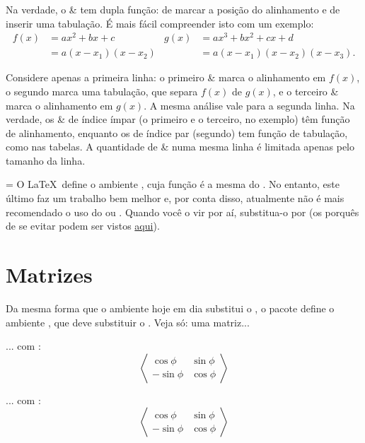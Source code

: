 \documentclass[a4paper,12pt]{amsart}
\newlength\atencaowidth
\newenvironment{atencao}{%
		\medskip%
		\noindent\hangindent=\atencaowidth\hangafter=-2%
		\hspace{-\atencaowidth}%
		\usebox{\atencaobox}\footnotesize
		\setlength\parindent\atencaowidth}{\par\medskip}
\begin{document}
	Na verdade, o \& tem dupla função: de marcar a posição do alinhamento e de inserir uma tabulação. É mais fácil compreender isto com um exemplo:
	\begin{align*}
	f(x) &= ax^2 + bx + c        &    g(x) &= ax^3 + bx^2 + cx + d \\
	     &= a (x - x_1)(x - x_2) &         &= a (x - x_1)(x - x_2)(x - x_3).
	\end{align*}
	
	Considere apenas a primeira linha: o primeiro \& marca o alinhamento em $f(x)$, o segundo marca uma tabulação, que separa $f(x)$ de $g(x)$, e o terceiro \& marca o alinhamento em $g(x)$. A mesma análise vale para a segunda linha. Na verdade, os \& de índice ímpar (o primeiro e o terceiro, no exemplo) têm função de alinhamento, enquanto os de índice par (segundo) tem função de tabulação, como nas tabelas.	A quantidade de \& numa mesma linha é limitada apenas pelo tamanho da linha.
	
	\begin{atencao}%
	O \LaTeX\ define o ambiente , cuja função é a mesma do . No entanto, este último faz um trabalho bem melhor e, por conta disso, atualmente não é mais recomendado o uso do  ou . Quando você o vir por aí, substitua-o por  (os porquês de se evitar  podem ser vistos \href{http://www.tug.org/pracjourn/2006-4/madsen/madsen.pdf}{aqui}).
	\end{atencao}
	
	\section{Matrizes}
	
	Da mesma forma que o ambiente  hoje em dia substitui o , o pacote  define o ambiente , que deve substituir o . Veja só: uma matriz...
	
	\medskip
	
	\noindent\hfill
	\begin{minipage}[t]{0.45\textwidth}
		\centering
		... com :		
		\begin{equation*}
			\left\langle\begin{matrix}
				 \cos\phi & \sin\phi \\
				-\sin\phi & \cos\phi
			\end{matrix}\right\rangle
		\end{equation*}
	\end{minipage}\hfill
	\begin{minipage}[t]{0.45\textwidth}
		\centering
		... com :
		\begin{equation*}
			\left\langle\begin{array}{cc}
				 \cos\phi & \sin\phi \\
				-\sin\phi & \cos\phi
			\end{array}\right\rangle
		\end{equation*}
	\end{minipage}%
	\hfill\null
	
\end{document}
